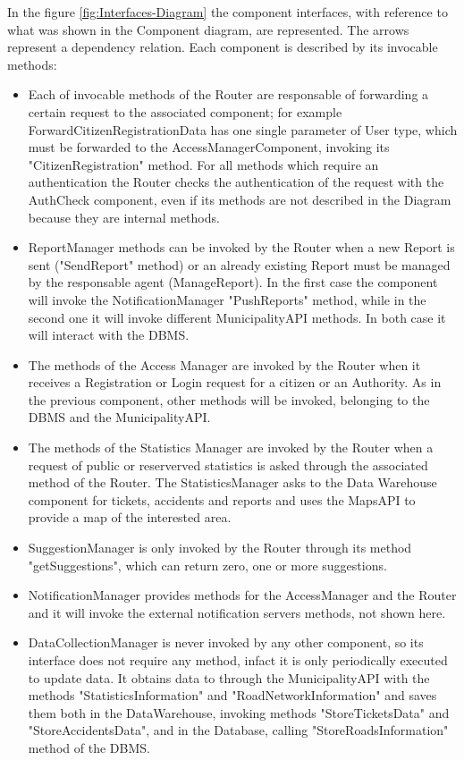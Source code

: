 \documentclass[a4paper]{report}
\begin{document}
In the figure \ref{fig:Interfaces-Diagram} the component interfaces, with reference to what was shown in the Component diagram, are represented. The arrows represent a dependency relation. Each component is described by its invocable methods:
\begin{itemize}
\item Each of invocable methods of the Router are responsable of forwarding a certain request to the associated component; for example ForwardCitizenRegistrationData has one single parameter of User type, which must be forwarded to the AccessManagerComponent, invoking its "CitizenRegistration" method.
For all methods which require an authentication the Router checks the authentication of the request with the AuthCheck component, even if its methods are not described in the Diagram because they are internal methods.
\item ReportManager methods can be invoked by the Router when a new Report is sent ("SendReport" method) or an already existing Report must be managed by the responsable agent (ManageReport). In the first case the component will invoke the NotificationManager "PushReports" method, while in the second one it will invoke different MunicipalityAPI methods. In both case it will interact with the DBMS.
\item The methods of the Access Manager are invoked by the Router when it receives a Registration or Login request for a citizen or an Authority. As in the previous component, other methods will be invoked, belonging to the DBMS and the MunicipalityAPI.
\item The methods of the Statistics Manager are invoked by the Router when a request of public or reserverved statistics is asked through the associated method of the Router. The StatisticsManager asks to the Data Warehouse component for tickets, accidents and reports and uses the MapsAPI to provide a map of the interested area.
\item SuggestionManager is only invoked by the Router through its method "getSuggestions", which can return zero, one or more suggestions.
\item NotificationManager provides methods for the AccessManager and the Router and it will invoke the external notification servers methods, not shown here.
\item DataCollectionManager is never invoked by any other component, so its interface does not require any method, infact it is only periodically executed to update data. It obtains data to through the MunicipalityAPI with the methods "StatisticsInformation" and "RoadNetworkInformation" and saves them both in the DataWarehouse, invoking methods "StoreTicketsData" and "StoreAccidentsData", and in the Database, calling "StoreRoadsInformation" method of the DBMS.

\end{itemize}
\end{document}
